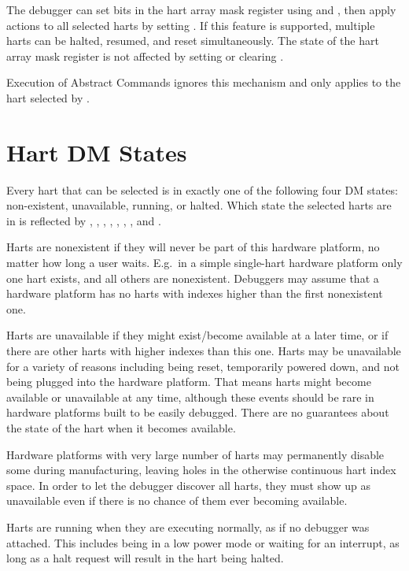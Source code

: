 The debugger can set bits in the hart array mask register using \RdmHawindowsel
and \RdmHawindow, then apply actions to all selected harts by setting \FdmDmcontrolHasel. If
this feature is supported, multiple harts can be halted, resumed, and reset
simultaneously. The state of the hart array mask register is not affected by
setting or clearing \FdmDmcontrolHasel.

Execution of Abstract Commands ignores this mechanism and only applies to the
hart selected by \Fhartsel.

\section{Hart DM States}

Every hart that can be selected is in exactly one of the following four DM states:
non-existent, unavailable, running, or halted. Which state
the selected harts are in is reflected by \FdmDmstatusAllnonexistent,
\FdmDmstatusAnynonexistent, \FdmDmstatusAllunavail, \FdmDmstatusAnyunavail,
\FdmDmstatusAllrunning, \FdmDmstatusAnyrunning, \FdmDmstatusAllhalted, and
\FdmDmstatusAnyhalted.

Harts are nonexistent if they will never be part of this hardware platform, no matter how
long a user waits. E.g.\ in a simple single-hart hardware platform only one hart exists,
and all others are nonexistent. Debuggers may assume that a hardware platform has no harts
with indexes higher than the first nonexistent one.

Harts are unavailable if they might exist/become available at a later time, or
if there are other harts with higher indexes than this one. Harts may be
unavailable for a variety of reasons including being reset, temporarily powered
down, and not being plugged into the hardware platform. That means harts might become
available or unavailable at any time, although these events should be rare
in hardware platforms built to be easily debugged.
There are no guarantees about the state of the hart when it becomes available.

Hardware platforms with very large number of harts may
permanently disable some during manufacturing, leaving holes in the otherwise
continuous hart index space. In order to let the debugger discover all harts,
they must show up as unavailable even if there is no chance of them ever
becoming available.


Harts are running when they are executing normally, as if no debugger was
attached. This includes being in a low power mode or waiting for an interrupt,
as long as a halt request will result in the hart being halted.

